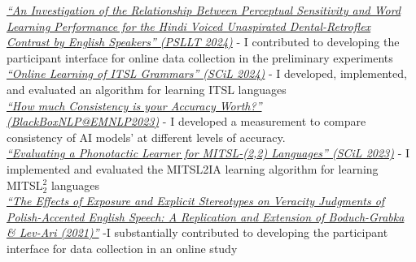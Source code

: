 \documentclass[a4paper,10pt]{article}
\newcommand{\resumeSection}[1]{\vspace{2pt}\noindent{\Large \textbf{#1}}\vspace{1pt}\newline}
\begin{document}
\resumeSection{Academic Publications}
    \textit{{\href{https://www.iastatedigitalpress.com/psllt/article/id/18429/}{``An Investigation of the Relationship Between Perceptual Sensitivity and Word Learning Performance for the Hindi Voiced Unaspirated Dental-Retroflex Contrast by English Speakers'' (PSLLT 2024)}}}
        - I contributed to developing the participant interface for online data collection in the preliminary experiments\\
    \textit{{\href{https://aclanthology.org/2024.scil-1.23/}{``Online Learning of ITSL Grammars'' (SCiL 2024)}}}
        - I developed, implemented, and evaluated an algorithm for learning ITSL languages\\
    \textit{{\href{https://aclanthology.org/2023.blackboxnlp-1.19/}{``How much Consistency is your Accuracy Worth?'' (BlackBoxNLP@EMNLP2023)}} }
        - I developed a measurement to compare consistency of AI models' at different levels of accuracy. \\
    \textit{\href{https://scholarworks.umass.edu/cgi/viewcontent.cgi?article=1268\&context=scil}{``Evaluating a Phonotactic Learner for MITSL-(2,2) Languages'' (SCiL 2023)}} 
        - I implemented and evaluated the {MITSL2IA learning algorithm} for learning MITSL$_2^2$ languages\\
    \textit{{\href{{https://www.cambridge.org/core/journals/studies-in-second-language-acquisition/article/effects-of-exposure-and-explicit-stereotypes-on-veracity-judgments-of-polishaccented-english-speech-a-preregistered-close-replication-and-extension-of-boduchgrabka-levari-2021/EF03B7A762B1442206B537F0AD4447A4}}{``The Effects of Exposure and Explicit Stereotypes on Veracity Judgments of Polish-Accented English Speech: A Replication and Extension of Boduch-Grabka \& Lev-Ari (2021)''}}} 
        -I substantially contributed to developing the participant interface for data collection in an online study

\end{document}
